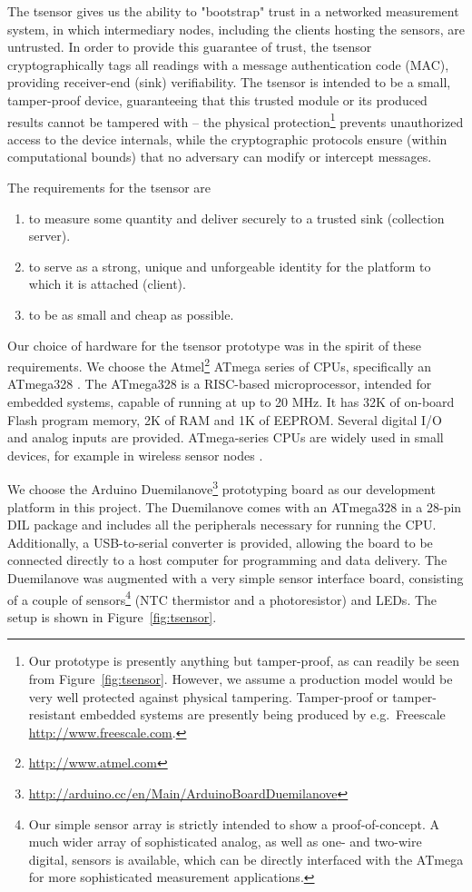 The tsensor gives us the ability to "bootstrap" trust in a networked measurement system, in which intermediary nodes, including the clients hosting the sensors, are untrusted. In order to provide this guarantee of trust, the tsensor cryptographically tags all readings with a message authentication code (MAC), providing receiver-end (sink) verifiability. The tsensor is intended to be a small, tamper-proof device, guaranteeing that this trusted module or its produced results cannot be tampered with -- the physical protection\footnote{Our prototype is presently anything but tamper-proof, as can readily be seen from Figure~\ref{fig:tsensor}. However, we assume a production model would be very well protected against physical tampering. Tamper-proof or tamper-resistant embedded systems are presently being produced by e.g.\ Freescale \url{http://www.freescale.com}.} prevents unauthorized access to the device internals, while the cryptographic protocols ensure (within computational bounds) that no adversary can modify or intercept messages. 

The requirements for the tsensor are
\begin{enumerate}
\item to measure some quantity and deliver securely to a trusted sink (collection server).
\item to serve as a strong, unique and unforgeable identity for the platform to which it is attached (client).
\item to be as small and cheap as possible.
\end{enumerate}

Our choice of hardware for the tsensor prototype was in the spirit of these requirements. We choose the Atmel\footnote{\url{http://www.atmel.com}} ATmega series of CPUs, specifically an ATmega328 \cite{atmel-atmega-series-2010}. The ATmega328 is a RISC-based microprocessor, intended for embedded systems, capable of running at up to 20 MHz. It has 32K of on-board Flash program memory, 2K of RAM and 1K of EEPROM. Several digital I/O and analog inputs are provided. ATmega-series CPUs are widely used in small devices, for example in wireless sensor nodes .

We choose the Arduino Duemilanove\footnote{\url{http://arduino.cc/en/Main/ArduinoBoardDuemilanove}} prototyping board as our development platform in this project. The Duemilanove comes with an ATmega328 in a  28-pin DIL package and includes all the peripherals necessary for running the CPU. Additionally, a USB-to-serial converter is provided, allowing the board to be connected directly to a host computer for programming and data delivery.
%
The Duemilanove was augmented with a very simple sensor interface board, consisting of a couple of sensors\footnote{Our simple sensor array is strictly intended to show a proof-of-concept. A much wider array of sophisticated analog, as well as one- and two-wire digital, sensors is available, which can be directly interfaced with the ATmega for more sophisticated measurement applications.} (NTC thermistor and a photoresistor) and LEDs. The setup is shown in Figure~\ref{fig:tsensor}.
%

